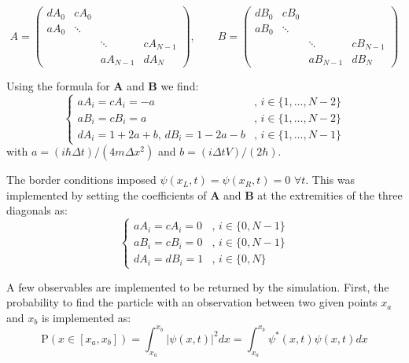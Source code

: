 \begin{equation}
    A = \left( \begin{matrix}
        dA_0 & cA_0      &          &   \\
        aA_0 & \ddots    &          &   \\
             &           & \ddots   & cA_{N-1} \\
             &           & aA_{N-1} & dA_N
        \end{matrix} \right)
    ,\qquad
    B = \left( \begin{matrix}
        dB_0 & cB_0      &          &   \\
        aB_0 & \ddots    &          &   \\
             &           & \ddots   & cB_{N-1} \\
             &           & aB_{N-1} & dB_N
        \end{matrix} \right)
\end{equation}

Using the formula for $\mathbf{A}$ and $\mathbf{B}$ we find:
\begin{equation}
    \begin{cases}
        aA_i = cA_i = -a &, \, i \in\{1, \dots, N-2\} \\
        aB_i = cB_i = a &, \, i \in\{1, \dots, N-2\} \\
        dA_i = 1 + 2a + b, \, dB_i = 1 - 2a - b  &, \, i \in\{1, \dots, N-1\}
    \end{cases}
\end{equation}
with $a = (i\hbar \Delta t)/(4m \Delta x^2)$ and $b = (i\Delta t V)/(2\hbar)$.

The border conditions imposed \(\psi(x_L, t) = \psi(x_R, t) = 0\,\, \forall t\). This was implemented by setting the coefficients of \(\mathbf{A}\) and \(\mathbf{B}\) at the extremities of the three diagonals as:
\begin{equation}
    \begin{cases}
        aA_i = cA_i = 0  &, \, i \in \{0, N-1\} \\
        aB_i = cB_i = 0  &, \, i \in \{0, N-1\} \\
        dA_i = dB_i = 1  &, \, i \in \{0, N\}
    \end{cases}
\end{equation}

A few observables are implemented to be returned by the simulation. First, the probability to find the particle with an observation between two given points $x_a$ and $x_b$ is implemented as:
\begin{equation}
    \mathrm{P}(x\in[x_a,x_b]) = \int_{x_a}^{x_b}|\psi(x,t)|^2 dx = \int_{x_a}^{x_b}\psi^*(x,t)\psi(x,t) dx
\end{equation}

